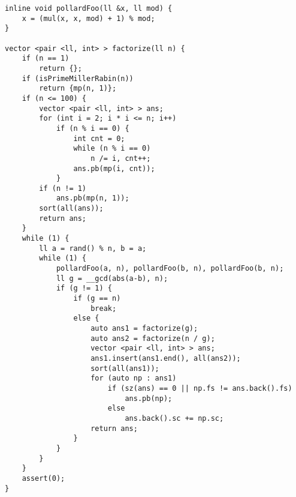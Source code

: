 \begin{verbatim}
inline void pollardFoo(ll &x, ll mod) {
	x = (mul(x, x, mod) + 1) % mod;
}

vector <pair <ll, int> > factorize(ll n) {
	if (n == 1)
		return {};
	if (isPrimeMillerRabin(n))
		return {mp(n, 1)};
	if (n <= 100) {
		vector <pair <ll, int> > ans;
		for (int i = 2; i * i <= n; i++)
			if (n % i == 0) {
				int cnt = 0;
				while (n % i == 0)
					n /= i, cnt++;
				ans.pb(mp(i, cnt));	
			}
		if (n != 1)
			ans.pb(mp(n, 1));
		sort(all(ans));
		return ans;
	}
	while (1) {
		ll a = rand() % n, b = a;
		while (1) {
			pollardFoo(a, n), pollardFoo(b, n), pollardFoo(b, n);
			ll g = __gcd(abs(a-b), n);
			if (g != 1) {
				if (g == n)
					break;
				else {
					auto ans1 = factorize(g);
					auto ans2 = factorize(n / g);
					vector <pair <ll, int> > ans;
					ans1.insert(ans1.end(), all(ans2));
					sort(all(ans1));
					for (auto np : ans1)
						if (sz(ans) == 0 || np.fs != ans.back().fs)
							ans.pb(np);
						else
							ans.back().sc += np.sc;
					return ans;
				}
			}
		}
	}
	assert(0);
}
\end{verbatim}
